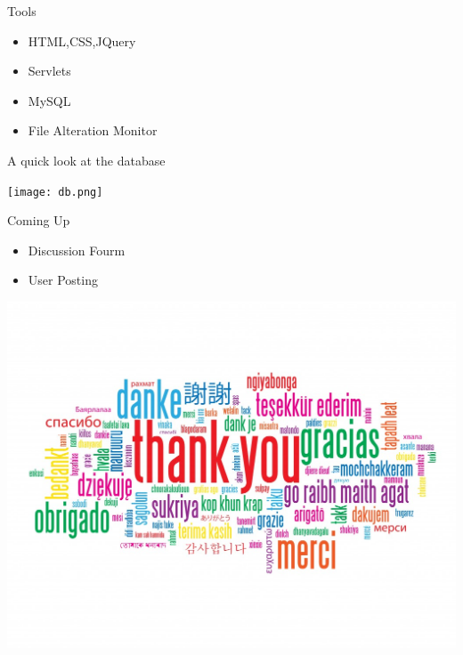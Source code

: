 \documentclass[14pt]{beamer}
\begin{document}
\begin{frame}{Tools}
	\begin{itemize}
		\item HTML,CSS,JQuery
		\item Servlets
		\item MySQL
		\item File Alteration Monitor
	\end{itemize}
\end{frame}


\begin{frame}{A quick look at the database}
	\begin{center}
		\texttt{[image: db.png]}
	\end{center}
\end{frame}

\begin{frame}{Coming Up}
	\begin{itemize}
		\item Discussion Fourm
		\item User Posting
	\end{itemize}
\end{frame}

\begin{frame}
	\begin{center}
		\includegraphics[scale=0.3]{ty.jpg}
	\end{center}
\end{frame}
\end{document}

